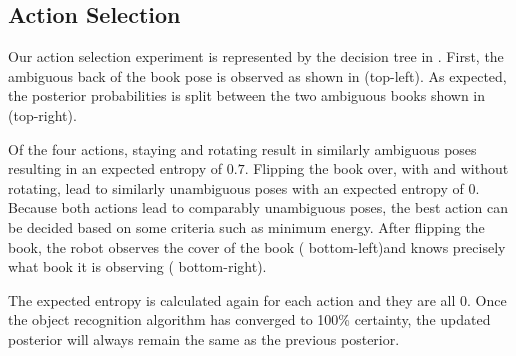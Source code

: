     \subsection{Action Selection}
	Our action selection experiment is represented by the decision tree in .    
	First, the ambiguous back of the book pose is observed as shown in  (top-left). As expected, the posterior probabilities is split between the two ambiguous books shown in  (top-right).    

 Of the four actions, staying and rotating result in similarly ambiguous poses resulting in an expected entropy of $0.7$. Flipping the book over, with and without rotating, lead to similarly unambiguous poses with an expected entropy of $0$. Because both actions lead to comparably unambiguous poses, the best action can be decided based on some criteria such as minimum energy. After flipping the book, the robot observes the cover of the book ( bottom-left)and knows precisely what book it is observing ( bottom-right).

        The expected entropy is calculated again for each action and they are all $0$. Once the object recognition algorithm has converged to 100\% certainty, the updated posterior will always remain the same as the previous posterior.
    
    

        
